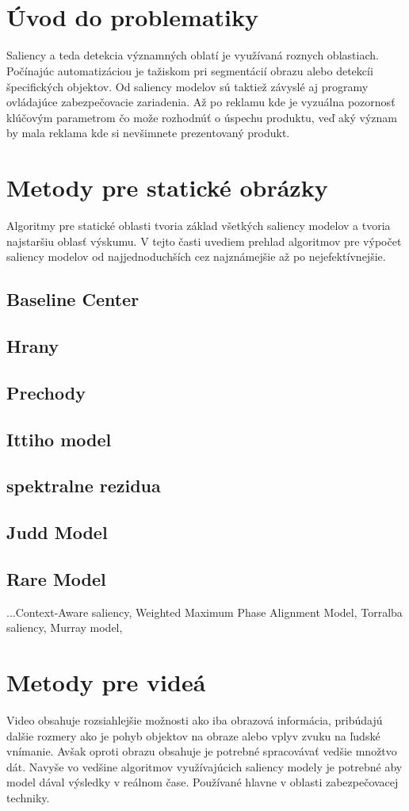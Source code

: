 \\\\
\section{Úvod do problematiky}
Saliency a teda detekcia významných oblatí je využívaná roznych oblastiach. Počínajúc automatizáciou je tažiskom pri segmentácií obrazu alebo detekcíi špecifických objektov. Od saliency modelov sú taktiež závyslé aj programy ovládajúce zabezpečovacie zariadenia. Až po reklamu kde je vyzuálna pozornosť klúčovým parametrom čo može rozhodnúť o úspechu produktu, veď aký význam by mala reklama kde si nevšimnete prezentovaný produkt.
\section{Metody pre statické obrázky}
Algoritmy pre statické oblasti tvoria základ všetkých saliency modelov a tvoria najstaršiu oblasť výskumu. V tejto časti uvediem prehlad algoritmov pre výpočet saliency modelov od najjednoduchších cez najznámejšie až po nejefektívnejšie.
\subsection{Baseline Center}
\subsection{Hrany}
\subsection{Prechody}
\subsection{Ittiho model}
\subsection{spektralne rezidua}
\subsection{Judd Model}
\subsection{Rare Model}
...Context-Aware saliency, Weighted Maximum Phase Alignment Model, Torralba saliency, Murray model,
\section{Metody pre videá}
Video obsahuje rozsiahlejšie možnosti ako iba obrazová informácia, pribúdajú dalšie rozmery ako je pohyb objektov na obraze alebo vplyv zvuku na ľudské vnímanie. Avšak oproti obrazu obsahuje je potrebné spracovávať vedšie množtvo
dát. Navyše vo vedšine algoritmov využívajúcich saliency modely je potrebné aby model dával výsledky v reálnom čase. Používané hlavne v oblasti zabezpečovacej techniky.
